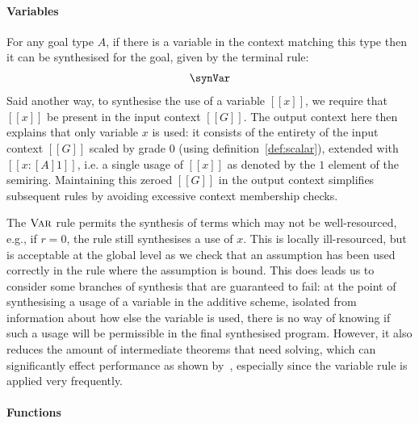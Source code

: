 \paragraph{Variables}
For any goal type $A$, if there is a variable in the context matching this type
then it can be synthesised for the goal, given by the terminal rule:
%
\begin{align*}
  \synVar
\end{align*}
%
Said another way, to synthesise the use of a variable $[[ x ]]$, we require that $[[ x ]]$ be
present in the input context $[[ G ]]$. The output context here then explains
that only variable $x$ is used: it consists of the
entirety of the input context $[[ G ]]$ scaled by grade $0$ (using
definition~\ref{def:scalar}), extended with $[[x : [A] 1]]$, i.e. a single usage
of $[[ x ]]$ as denoted by the $1$ element of the semiring.
Maintaining this zeroed $[[ G ]]$ in the output context simplifies
subsequent rules by avoiding excessive context membership checks.

The $\textsc{Var}$ rule permits the synthesis of terms which may not
be well-resourced, e.g., if $r = 0$, the rule still synthesises a use of
$x$. This is locally ill-resourced, but is acceptable at the global
level as we check that an assumption has been used correctly in the rule where the assumption is bound. This does leads us to consider some branches of synthesis
that are guaranteed to fail: at the point of synthesising a usage of a
variable in the additive scheme, isolated from information about how
else the variable is used, there is no way of knowing if such a usage
will be permissible in the final synthesised program. However, it also
reduces the amount of intermediate theorems that need solving, which
can significantly effect performance as shown
by~\citet{DBLP:conf/lopstr/HughesO20}, especially since the variable
rule is applied very frequently.

\paragraph{Functions}

